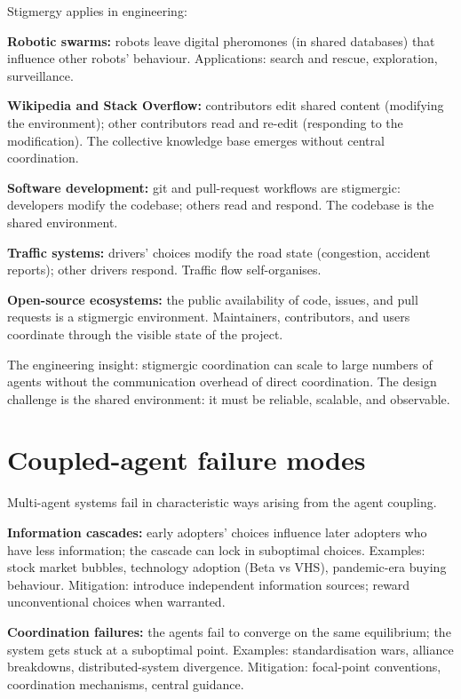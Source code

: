 Stigmergy applies in engineering:

\textbf{Robotic swarms:} robots leave digital pheromones (in shared databases) that influence other robots' behaviour. Applications: search and rescue, exploration, surveillance.

\textbf{Wikipedia and Stack Overflow:} contributors edit shared content (modifying the environment); other contributors read and re-edit (responding to the modification). The collective knowledge base emerges without central coordination.

\textbf{Software development:} git and pull-request workflows are stigmergic: developers modify the codebase; others read and respond. The codebase is the shared environment.

\textbf{Traffic systems:} drivers' choices modify the road state (congestion, accident reports); other drivers respond. Traffic flow self-organises.

\textbf{Open-source ecosystems:} the public availability of code, issues, and pull requests is a stigmergic environment. Maintainers, contributors, and users coordinate through the visible state of the project.

The engineering insight: stigmergic coordination can scale to large numbers of agents without the communication overhead of direct coordination. The design challenge is the shared environment: it must be reliable, scalable, and observable.

\section{Coupled-agent failure modes}

Multi-agent systems fail in characteristic ways arising from the agent coupling.

\textbf{Information cascades:} early adopters' choices influence later adopters who have less information; the cascade can lock in suboptimal choices. Examples: stock market bubbles, technology adoption (Beta vs VHS), pandemic-era buying behaviour. Mitigation: introduce independent information sources; reward unconventional choices when warranted.

\textbf{Coordination failures:} the agents fail to converge on the same equilibrium; the system gets stuck at a suboptimal point. Examples: standardisation wars, alliance breakdowns, distributed-system divergence. Mitigation: focal-point conventions, coordination mechanisms, central guidance.

